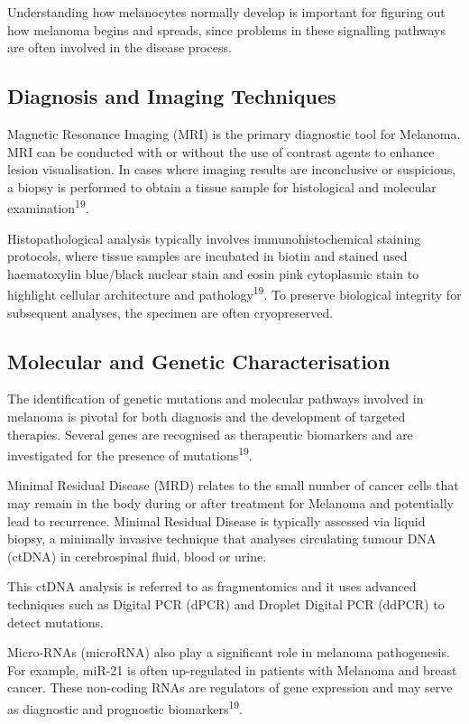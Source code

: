\documentclass[
]{article}
\begin{document}
Understanding how melanocytes normally develop is important for figuring
out how melanoma begins and spreads, since problems in these signalling
pathways are often involved in the disease process.

\subsection{Diagnosis and Imaging
Techniques}\label{diagnosis-and-imaging-techniques}

Magnetic Resonance Imaging (MRI) is the primary diagnostic tool for
Melanoma. MRI can be conducted with or without the use of contrast
agents to enhance lesion visualisation. In cases where imaging results
are inconclusive or suspicious, a biopsy is performed to obtain a tissue
sample for histological and molecular examination\textsuperscript{19}.

Histopathological analysis typically involves immunohistochemical
staining protocols, where tissue samples are incubated in biotin and
stained used haematoxylin blue/black nuclear stain and eosin pink
cytoplasmic stain to highlight cellular architecture and
pathology\textsuperscript{19}. To preserve biological integrity for
subsequent analyses, the specimen are often cryopreserved.

\subsection{Molecular and Genetic
Characterisation}\label{molecular-and-genetic-characterisation}

The identification of genetic mutations and molecular pathways involved
in melanoma is pivotal for both diagnosis and the development of
targeted therapies. Several genes are recognised as therapeutic
biomarkers and are investigated for the presence of
mutations\textsuperscript{19}.

Minimal Residual Disease (MRD) relates to the small number of cancer
cells that may remain in the body during or after treatment for Melanoma
and potentially lead to recurrence. Minimal Residual Disease is
typically assessed via liquid biopsy, a minimally invasive technique
that analyses circulating tumour DNA (ctDNA) in cerebrospinal fluid,
blood or urine.

This ctDNA analysis is referred to as fragmentomics and it uses advanced
techniques such as Digital PCR (dPCR) and Droplet Digital PCR (ddPCR) to
detect mutations.

Micro-RNAs (microRNA) also play a significant role in melanoma
pathogenesis. For example, miR-21 is often up-regulated in patients with
Melanoma and breast cancer. These non-coding RNAs are regulators of gene
expression and may serve as diagnostic and prognostic
biomarkers\textsuperscript{19}.
\end{document}
